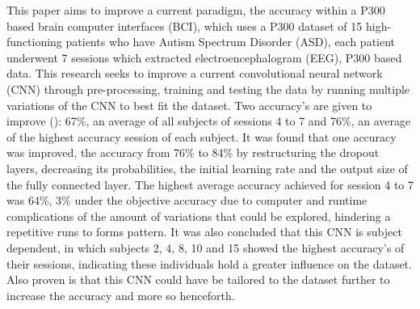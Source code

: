 This paper aims to improve a current paradigm, the accuracy within a P300 based brain computer interfaces (BCI), which uses a P300 dataset of 15 high-functioning patients who have Autism Spectrum Disorder (ASD), each patient underwent 7 sessions which extracted electroencephalogram (EEG), P300 based data. This research seeks to improve a current convolutional neural network (CNN) through pre-processing, training and testing the data by running multiple variations of the CNN to best fit the dataset. Two accuracy’s are given to improve (\cite{PalaniPaper}): 67\%, an average of all subjects of sessions 4 to 7 and 76\%, an average of the highest accuracy session of each subject. It was found that one accuracy was improved, the accuracy from 76\% to 84\% by restructuring the dropout layers, decreasing its probabilities, the initial learning rate and the output size of the fully connected layer. The highest average accuracy achieved for session 4 to 7 was 64\%, 3\% under the objective accuracy due to computer and runtime complications of the amount of variations that could be explored, hindering a repetitive runs to forms pattern. It was also concluded that this CNN is subject dependent, in which subjects 2, 4, 8, 10 and 15 showed the highest accuracy’s of their sessions, indicating these individuals hold a greater influence on the dataset. Also proven is that this CNN could have be tailored to the dataset further to increase the accuracy and more so henceforth.
